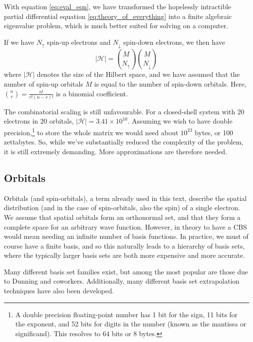 With equation \ref{eq:eval_eqn}, we have transformed the hopelessly intractible partial differential equation \ref{eq:theory_of_everything} into a finite algebraic eigenvalue problem, which is much better suited for solving on a computer.

If we have $N_\uparrow$ spin-up electrons and $N_\downarrow$ spin-down electrons, we then have
\begin{equation}
\label{eq:scaling}
|\mathcal{H}| = {M \choose N_\uparrow}{M\choose N_\downarrow}
\end{equation}
where $|\mathcal{H}|$ denotes the size of the Hilbert space, and we have assumed that the number of spin-up orbitals $M$ is equal to the number of spin-down orbitals. Here, ${n\choose r}=\frac{n!}{r!(n-r)!}$ is a binomial coefficient.

The combinatorial scaling is still unfavourable. For a closed-shell system with 20 electrons in 20 orbitals, $|\mathcal{H}|=3.41\times 10^{10}$. Assuming we wish to have double precision,\footnote{A double precision floating-point number has 1 bit for the sign, 11 bits for the exponent, and 52 bits for digits in the number (known as the mantissa or significand).\cite{ascherFirst2011} This resolves to 64 bits or 8 bytes.} to store the whole matrix we would need about $10^{23}$ bytes, or 100 zettabytes. So, while we've substantially reduced the complexity of the problem, it is still extremely demanding. More approximations are therefore needed.

\subsection{Orbitals}
\label{sec:orbitals}

Orbitals (and spin-orbitals), a term already used in this text, describe the spatial distribution (and in the case of spin-orbitals, also the spin) of a single electron. We assume that spatial orbitals form an orthonormal set, and that they form a complete space for an arbitrary wave function. However, in theory to have a \gls{CBS} would mean needing an infinite number of basis functions. In practice, we must of course have a finite basis, and so this naturally leads to a hierarchy of basis sets, where the typically larger basis sets are both more expensive and more accurate.

Many different basis set families exist, but among the most popular are those due to Dunning and coworkers.\cite{dunningGaussian1989} Additionally, many different basis set extrapolation techniques have also been developed.\cite{fellerEffectiveness2011,halkierBasisset1998,halkierBasisset1999,helgakerBasisset1997,jensenBasis1999,pansiniExtrapolation2016,petersonBenchmark1994,woonBenchmark1994}

